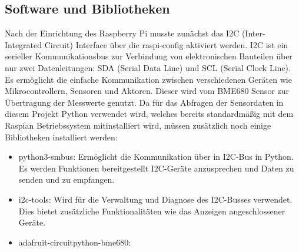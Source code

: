 \documentclass[conference]{IEEEtran}
\begin{document}
\subsection{Software und Bibliotheken}
Nach der Einrichtung des Raspberry Pi musste zunächst das I2C (Inter-Integrated Circuit) Interface über die raspi-config aktiviert werden. I2C  ist ein serieller Kommunikationsbus zur Verbindung von elektronischen Bauteilen über nur zwei Datenleitungen: SDA (Serial Data Line) und SCL (Serial Clock Line). Es ermöglicht die einfache Kommunikation zwischen verschiedenen Geräten wie Mikrocontrollern, Sensoren und Aktoren. Dieser wird vom BME680 Sensor zur Übertragung der Messwerte genutzt. Da für das Abfragen der Sensordaten in diesem Projekt Python verwendet wird, welches bereits standardmäßig mit dem Raspian Betriebssystem mitinstalliert wird, müssen zusätzlich noch einige Bibliotheken installiert werden: 
\begin{itemize}
	\item python3-smbus: Ermöglicht die Kommunikation über in I2C-Bus in Python. Es werden Funktionen bereitgestellt I2C-Geräte anzusprechen und Daten zu senden und zu empfangen.
	\item i2c-tools: Wird für die Verwaltung und Diagnose des I2C-Busses verwendet. Dies bietet zusätzliche Funktionalitäten wie das Anzeigen angeschlossener Geräte.
	\item adafruit-circuitpython-bme680: 
\end{itemize}
\end{document}
